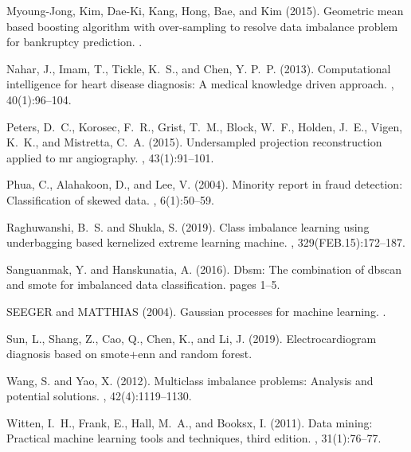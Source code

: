 \documentclass[runningheads]{llncs}
\begin{document}
\begin{thebibliography}{8}
  Myoung-Jong, Kim, Dae-Ki, Kang, Hong, Bae, and Kim (2015).
  \newblock Geometric mean based boosting algorithm with over-sampling to resolve
    data imbalance problem for bankruptcy prediction.
  .
  
  Nahar, J., Imam, T., Tickle, K.~S., and Chen, Y. P.~P. (2013).
  \newblock Computational intelligence for heart disease diagnosis: A medical
    knowledge driven approach.
  , 40(1):96--104.
  
  Peters, D.~C., Korosec, F.~R., Grist, T.~M., Block, W.~F., Holden, J.~E.,
    Vigen, K.~K., and Mistretta, C.~A. (2015).
  \newblock Undersampled projection reconstruction applied to mr angiography.
  , 43(1):91--101.
  
  Phua, C., Alahakoon, D., and Lee, V. (2004).
  \newblock Minority report in fraud detection: Classification of skewed data.
  , 6(1):50--59.
  
  Raghuwanshi, B.~S. and Shukla, S. (2019).
  \newblock Class imbalance learning using underbagging based kernelized extreme
    learning machine.
  , 329(FEB.15):172--187.
  
  Sanguanmak, Y. and Hanskunatia, A. (2016).
  \newblock Dbsm: The combination of dbscan and smote for imbalanced data
    classification.
  \newblock pages 1--5.
  
  SEEGER and MATTHIAS (2004).
  \newblock Gaussian processes for machine learning.
  .
  
  Sun, L., Shang, Z., Cao, Q., Chen, K., and Li, J. (2019).
  \newblock Electrocardiogram diagnosis based on smote+enn and random forest.
  
  {Wang}, S. and {Yao}, X. (2012).
  \newblock Multiclass imbalance problems: Analysis and potential solutions.
  , 42(4):1119--1130.
  
  Witten, I.~H., Frank, E., Hall, M.~A., and Booksx, I. (2011).
  \newblock Data mining: Practical machine learning tools and techniques, third
    edition.
  , 31(1):76--77.
  

\end{thebibliography}
\end{document}
